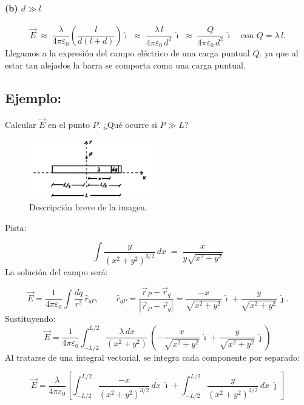 \documentclass[a4paper,12pt]{article}
\begin{document}
\paragraph*{(b) $d\gg l$}
\[
\vec E \;\approx\; \frac{\lambda}{4\pi\varepsilon_0}\left(\frac{l}{d(l+d)}\right)\hat{\imath}
\;\approx\; \frac{\lambda\,l}{4\pi\varepsilon_0\,d^{2}}\,\hat{\imath}
\;\approx\; \frac{Q}{4\pi\varepsilon_0\,d^{2}}\,\hat{\imath}
\quad\text{con } Q=\lambda\,l.
\]
Llegamos a la expresión del campo eléctrico de una carga puntual $Q$. ya que al estar tan alejados la barra se comporta como una carga puntual.

\newpage

\subsection*{Ejemplo:}

Calcular $\vec E$ en el punto $P$.  
¿Qué ocurre si $P \gg L$?

\begin{figure}[h]
  \centering
  \includegraphics[width=0.5\textwidth]{imagen_4.jpeg}
  \caption{Descripción breve de la imagen.}
  \label{fig:imagen4}
\end{figure}

\noindent Pista: 

\[
\int \frac{y}{(x^2+y^2)^{3/2}}\,dx \;=\; \frac{x}{y\sqrt{x^2+y^2}}
\]
La solución del campo será:

\[
\vec E = \frac{1}{4\pi\varepsilon_0} \int \frac{dq}{r^2}\,\hat r_{qP},
\qquad
\hat r_{qP} = \frac{\vec r_P-\vec r_q}{|\vec r_P-\vec r_q|}
= \frac{-x}{\sqrt{x^2+y^2}}\,\hat{\imath} + \frac{y}{\sqrt{x^2+y^2}}\,\hat{\jmath}.
\]
Sustituyendo:
\[
\vec E = \frac{1}{4\pi\varepsilon_0} \int_{-L/2}^{L/2}
\frac{\lambda\,dx}{(x^2+y^2)}\,
\left( -\frac{x}{\sqrt{x^2+y^2}}\,\hat{\imath}
+ \frac{y}{\sqrt{x^2+y^2}}\,\hat{\jmath} \right)
\]
Al tratarse de una integral vectorial, se integra cada componente por separado:

\[
\vec E =
\frac{\lambda}{4\pi\varepsilon_0} \left[
\int_{-L/2}^{L/2} \frac{-x}{(x^2+y^2)^{3/2}}\,dx \;\hat{\imath}
+ \int_{-L/2}^{L/2} \frac{y}{(x^2+y^2)^{3/2}}\,dx \;\hat{\jmath}
\right]
\]
\end{document}
